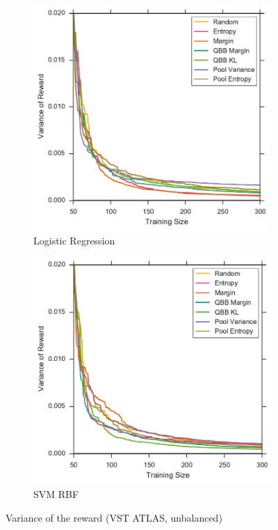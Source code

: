 \begin{figure}[p]
	\centering
	\begin{subfigure}{.5\textwidth}
		\centering
		\includegraphics[width=0.99\textwidth]{figures/5_thompson/vstatlas_ul_sigmas}
		\caption{Logistic Regression}
		\label{fig:vstatlas_l_sigmas}
	\end{subfigure}%
	\begin{subfigure}{.5\textwidth}
		\centering
		\includegraphics[width=0.99\linewidth]{figures/5_thompson/vstatlas_ur_sigmas}
		\caption{SVM RBF}
		\label{fig:vstatlas_ur_sigmas}
	\end{subfigure}
	\caption[Variance of the reward (VST ATLAS, unbalanced)]{
		Variance of the reward (VST ATLAS, unbalanced)}
	\label{fig:vstatlas_u_sigmas}
\end{figure}



